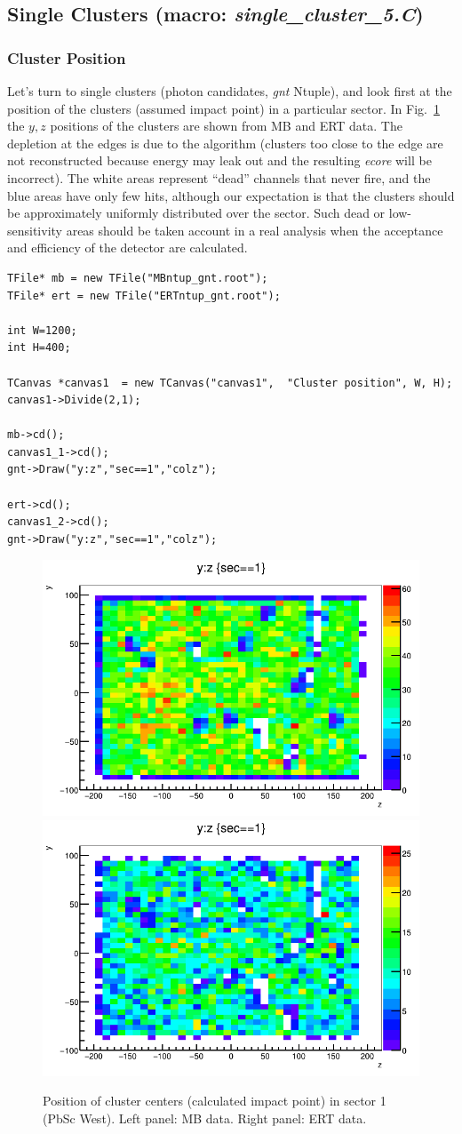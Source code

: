 \documentclass[pdftex,12pt,letter]{article}
\begin{document}
\subsection{Single Clusters (macro: \textit{single\_cluster\_5.C})}
\subsubsection{Cluster Position}
Let's turn to single clusters (photon candidates, {\it gnt} Ntuple),
and look first at the position of the clusters (assumed impact point)
in a particular sector.  In Fig.~\ref{fig:deadhot} the $y,z$ positions
of the clusters are shown from MB and ERT data.  The depletion at the
edges is due to the algorithm (clusters too close to the edge are not
reconstructed because energy may leak out and the resulting 
{\it  ecore} will be incorrect).  The white areas represent ``dead''
channels that never fire, and the blue areas have only few hits,
although our expectation is that the clusters should be approximately
uniformly distributed over the sector.  Such dead or low-sensitivity
areas should be taken account in a real analysis when the acceptance
and efficiency of the detector are calculated.

\begin{lstlisting}
TFile* mb = new TFile("MBntup_gnt.root");
TFile* ert = new TFile("ERTntup_gnt.root");

int W=1200;
int H=400;

TCanvas *canvas1  = new TCanvas("canvas1",  "Cluster position", W, H);
canvas1->Divide(2,1);

mb->cd();
canvas1_1->cd();
gnt->Draw("y:z","sec==1","colz");

ert->cd();
canvas1_2->cd();
gnt->Draw("y:z","sec==1","colz");
\end{lstlisting}


\begin{center}
\begin{figure}[htbp]
  \includegraphics[width=0.4\linewidth]{figs/mbsec1_yz.png}
  \includegraphics[width=0.4\linewidth]{figs/ertsec1_yz.png}
  \caption{Position of cluster centers (calculated impact point) in
    sector 1 (PbSc West).  Left panel: MB data.  Right panel: ERT data.
  }
    \label{fig:deadhot}
\end{figure}
\end{center}
\end{document}
